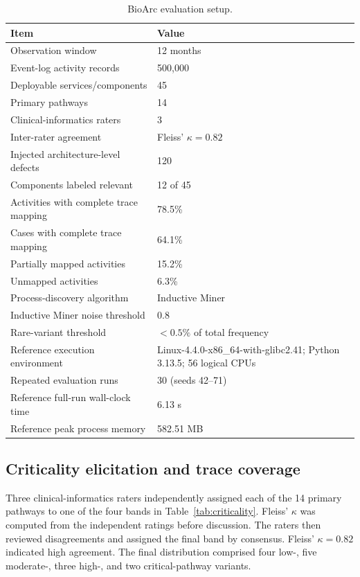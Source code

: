 \documentclass[english,preprint]{elsarticle}
\begin{document}
\begin{table}[htbp]
\caption{BioArc evaluation setup.}
\label{tab:setup}
\small
\begin{tabularx}{\textwidth}{@{}p{}Y@{}}
\toprule
\textbf{Item} & \textbf{Value} \\
\midrule
Observation window & 12 months \\
Event-log activity records & 500,000 \\
Deployable services/components & 45 \\
Primary pathways & 14 \\
Clinical-informatics raters & 3 \\
Inter-rater agreement & Fleiss' $\kappa=0.82$ \\
Injected architecture-level defects & 120 \\
Components labeled relevant & 12 of 45 \\
Activities with complete trace mapping & 78.5\% \\
Cases with complete trace mapping & 64.1\% \\
Partially mapped activities & 15.2\% \\
Unmapped activities & 6.3\% \\
Process-discovery algorithm & Inductive Miner \\
Inductive Miner noise threshold & 0.8 \\
Rare-variant threshold & $<0.5\%$ of total frequency \\
Reference execution environment & Linux-4.4.0-x86\_64-with-glibc2.41; Python 3.13.5; 56 logical CPUs \\
Repeated evaluation runs & 30 (seeds 42--71) \\
Reference full-run wall-clock time & 6.13 s \\
Reference peak process memory & 582.51 MB \\
\bottomrule
\end{tabularx}
\end{table}

\subsection{Criticality elicitation and trace coverage}

Three clinical-informatics raters independently assigned each of the 14 primary pathways to one of the four bands in Table~\ref{tab:criticality}. Fleiss' $\kappa$ was computed from the independent ratings before discussion. The raters then reviewed disagreements and assigned the final band by consensus. Fleiss' $\kappa=0.82$ indicated high agreement. The final distribution comprised four low-, five moderate-, three high-, and two critical-pathway variants.
\end{document}
